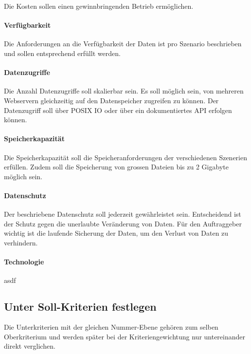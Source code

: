 Die Kosten sollen einen gewinnbringenden Betrieb ermöglichen. 

\paragraph{Verfügbarkeit}\label{Soll-2}
Die Anforderungen an die Verfügbarkeit der Daten ist pro Szenario beschrieben und sollen entsprechend erfüllt werden. 

\paragraph{Datenzugriffe}\label{Soll-3}
Die Anzahl Datenzugriffe soll skalierbar sein. Es soll möglich sein, von mehreren Webservern gleichzeitig auf den Datenspeicher zugreifen zu können. Der Datenzugriff soll über POSIX IO oder über ein dokumentiertes API erfolgen können.

\paragraph{Speicherkapazität}\label{Soll-4}
Die Speicherkapazität soll die Speicheranforderungen der verschiedenen Szenerien erfüllen. Zudem soll die Speicherung von grossen Dateien bis zu 2 Gigabyte möglich sein.

\paragraph{Datenschutz}\label{Soll-5}
Der beschriebene Datenschutz soll jederzeit gewährleistet sein. Entscheidend ist der Schutz gegen die unerlaubte Veränderung von Daten. Für den Auftraggeber wichtig ist die laufende Sicherung der Daten, um den Verlust von Daten zu verhindern.

\paragraph{Technologie}\label{Soll-6}
asdf


\subsection{Unter Soll-Kriterien festlegen}
Die Unterkriterien mit der gleichen Nummer-Ebene gehören zum selben Oberkriterium und werden später bei der Kriteriengewichtung nur untereinander direkt verglichen.


\renewcommand\theparagraph{Soll-1-\arabic{paragraph}}
\setcounter{paragraph}{0}


